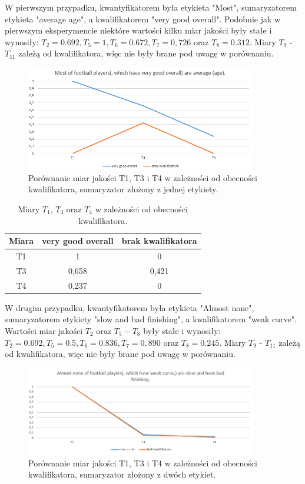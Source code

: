 \documentclass{classrep}
\begin{document}
	W pierwszym przypadku, kwantyfikatorem była etykieta "Most", sumaryzatorem etykieta "average age", a kwalifikatorem "very good overall". Podobnie jak w pierwszym eksperymencie niektóre wartości kilku miar jakości były stałe i wynosiły: $T_2 = 0.692, T_5 = 1, T_6 = 0.672, T_7 = 0,726$ oraz $T_8 = 0.312$. Miary $T_9$ - $T_{11}$ zależą od kwalifikatora, więc nie były brane pod uwagę w porównaniu.
	
	\begin{figure}[h!]
		\centering
		\includegraphics[width=0.9\textwidth]{ex/2a.png}
		\caption{Porównanie miar jakości T1, T3 i T4 w zależności od obecności kwalifikatora, sumaryzator złożony z jednej etykiety.}
		\label{wyniki2a}
	\end{figure}
	
	\begin{table}[h!]
		\centering
		\begin{tabular} {c c c}
			\hline
			\textbf{Miara} & \textbf{very good overall} & \textbf{brak kwalifikatora} \\ [0.5ex] 
			\hline	
			\hline 
			T1	&1&	0\\
			T3	&0,658&	0,421\\
			T4	&0,237&	0\\			
			\hline			
		\end{tabular}
		\caption{Miary $T_1$, $T_3$ oraz $T_4$ w zależności od obecności kwalifikatora. }
		\label{tabelaex2}
	\end{table}

	W drugim przypadku, kwantyfikatorem była etykieta "Almost none", sumaryzatorem etykiety "slow and bad finishing", a kwalifikatorem "weak curve". Wartości miar jakości $T_2$ oraz $T_5 - T_8$ były stałe i wynosiły: $T_2 = 0.692, T_5 = 0.5, T_6 = 0.836, T_7 = 0,890$ oraz $T_8 = 0.245$. Miary $T_9$ - $T_{11}$ zależą od kwalifikatora, więc nie były brane pod uwagę w porównaniu.	
	
	
	\begin{figure}[h!]
		\centering
		\includegraphics[width=0.9\textwidth]{ex/2b.png}
		\caption{Porównanie miar jakości T1, T3 i T4 w zależności od obecności kwalifikatora, sumaryzator złożony z dwóch etykiet.}
		\label{wyniki2b}
	\end{figure}
	
\end{document}
